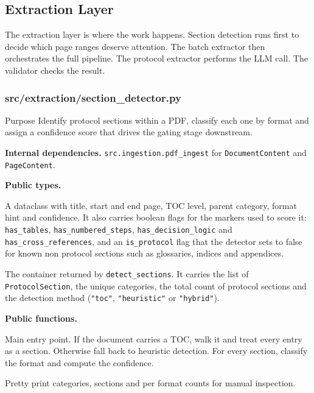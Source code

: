 \documentclass{article}
\begin{document}
\subsection{Extraction Layer}

The extraction layer is where the work happens. Section detection runs
first to decide which page ranges deserve attention. The batch
extractor then orchestrates the full pipeline. The protocol extractor
performs the LLM call. The validator checks the result.

\subsubsection{src/extraction/section\_detector.py}

\begin{codeconceptbox}{Purpose}
Identify protocol sections within a PDF, classify each one by format
and assign a confidence score that drives the gating stage downstream.
\end{codeconceptbox}

\textbf{Internal dependencies.}
\texttt{src.ingestion.pdf\_ingest} for \texttt{DocumentContent} and
\texttt{PageContent}.

\textbf{Public types.}

\begin{description}[leftmargin=2em, style=nextline]
\item[\texttt{ProtocolSection}]
A dataclass with title, start and end page, TOC level, parent
category, format hint and confidence. It also carries boolean flags
for the markers used to score it: \texttt{has\_tables},
\texttt{has\_numbered\_steps}, \texttt{has\_decision\_logic} and
\texttt{has\_cross\_references}, and an \texttt{is\_protocol} flag
that the detector sets to false for known non protocol sections such
as glossaries, indices and appendices.
\item[\texttt{DetectionResult}]
The container returned by \texttt{detect\_sections}. It carries the
list of \texttt{ProtocolSection}, the unique categories, the total
count of protocol sections and the detection method
(\texttt{"toc"}, \texttt{"heuristic"} or \texttt{"hybrid"}).
\end{description}

\textbf{Public functions.}

\begin{description}[leftmargin=2em, style=nextline]
\item[\texttt{detect\_sections(doc)}]
Main entry point. If the document carries a TOC, walk it and treat
every entry as a section. Otherwise fall back to heuristic detection.
For every section, classify the format and compute the confidence.
\item[\texttt{print\_detection\_summary(result)}]
Pretty print categories, sections and per format counts for manual
inspection.
\end{description}
\end{document}
